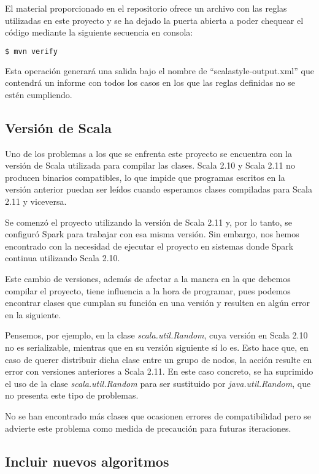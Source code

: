 El material proporcionado en el repositorio ofrece un archivo con las reglas utilizadas en este proyecto y se ha dejado la puerta abierta a poder chequear el código mediante la siguiente secuencia en consola:

\begin{lstlisting}[language=bash]
$ mvn verify
\end{lstlisting}

Esta operación generará una salida bajo el nombre de ``scalastyle-output.xml'' que contendrá un informe con todos los casos en los que las reglas definidas no se estén cumpliendo.

\subsection{Versión de Scala}

Uno de los problemas a los que se enfrenta este proyecto se encuentra con la versión de Scala utilizada para compilar las clases. Scala 2.10 y Scala 2.11 no producen binarios compatibles, lo que impide que programas escritos en la versión anterior puedan ser leídos cuando esperamos clases compiladas para Scala 2.11 y viceversa.

Se comenzó el proyecto utilizando la versión de Scala 2.11 y, por lo tanto, se configuró Spark para trabajar con esa misma versión. Sin embargo, nos hemos encontrado con la necesidad de ejecutar el proyecto en sistemas donde Spark continua utilizando Scala 2.10.

Este cambio de versiones, además de afectar a la manera en la que debemos compilar el proyecto, tiene influencia a la hora de programar, pues podemos encontrar clases que cumplan su función en una versión y resulten en algún error en la siguiente. 

Pensemos, por ejemplo, en la clase \textit{scala.util.Random}, cuya versión en Scala 2.10 no es serializable, mientras que en su versión siguiente sí lo es. Esto hace que, en caso de querer distribuir dicha clase entre un grupo de nodos, la acción resulte en error con versiones anteriores a Scala 2.11. En este caso concreto, se ha suprimido el uso de la clase \textit{scala.util.Random} para ser sustituido por \textit{java.util.Random}, que no presenta este tipo de problemas.

No se han encontrado más clases que ocasionen errores de compatibilidad pero se advierte este problema como medida de precaución para futuras iteraciones.

\subsection{Incluir nuevos algoritmos}

